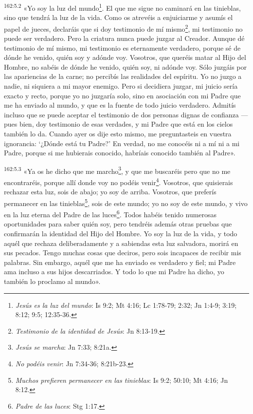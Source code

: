 \par
\textsuperscript{162:5.2} «Yo soy la luz del mundo\footnote{\textit{Jesús es la luz del mundo}: Is 9:2; Mt 4:16; Lc 1:78-79; 2:32; Jn 1:4-9; 3:19; 8:12; 9:5; 12:35-36.}. El que me sigue no caminará en las tinieblas, sino que tendrá la luz de la vida. Como os atrevéis a enjuiciarme y asumís el papel de jueces, declaráis que si doy testimonio de mí mismo\footnote{\textit{Testimonio de la identidad de Jesús}: Jn 8:13-19.}, mi testimonio no puede ser verdadero. Pero la criatura nunca puede juzgar al Creador. Aunque dé testimonio de mí mismo, mi testimonio es eternamente verdadero, porque sé de dónde he venido, quién soy y adónde voy. Vosotros, que queréis matar al Hijo del Hombre, no sabéis de dónde he venido, quién soy, ni adónde voy. Sólo juzgáis por las apariencias de la carne; no percibís las realidades del espíritu. Yo no juzgo a nadie, ni siquiera a mi mayor enemigo. Pero si decidiera juzgar, mi juicio sería exacto y recto, porque yo no juzgaría solo, sino en asociación con mi Padre que me ha enviado al mundo, y que es la fuente de todo juicio verdadero. Admitís incluso que se puede aceptar el testimonio de dos personas dignas de confianza ---pues bien, doy testimonio de esas verdades, y mi Padre que está en los cielos también lo da. Cuando ayer os dije esto mismo, me preguntasteis en vuestra ignorancia: `¿Dónde está tu Padre?' En verdad, no me conocéis ni a mí ni a mi Padre, porque si me hubierais conocido, habríais conocido también al Padre».

\par
\textsuperscript{162:5.3} «Ya os he dicho que me marcho\footnote{\textit{Jesús se marcha}: Jn 7:33; 8:21a.}, y que me buscaréis pero que no me encontraréis, porque allí donde voy no podéis venir\footnote{\textit{No podéis venir}: Jn 7:34-36; 8:21b-23.}. Vosotros, que quisierais rechazar esta luz, sois de abajo; yo soy de arriba. Vosotros, que preferís permanecer en las tinieblas\footnote{\textit{Muchos prefieren permanecer en las tinieblas}: Is 9:2; 50:10; Mt 4:16; Jn 8:12.}, sois de este mundo; yo no soy de este mundo, y vivo en la luz eterna del Padre de las luces\footnote{\textit{Padre de las luces}: Stg 1:17.}. Todos habéis tenido numerosas oportunidades para saber quién soy, pero tendréis además otras pruebas que confirmarán la identidad del Hijo del Hombre. Yo soy la luz de la vida, y todo aquél que rechaza deliberadamente y a sabiendas esta luz salvadora, morirá en sus pecados. Tengo muchas cosas que deciros, pero sois incapaces de recibir mis palabras. Sin embargo, aquél que me ha enviado es verdadero y fiel; mi Padre ama incluso a sus hijos descarriados. Y todo lo que mi Padre ha dicho, yo también lo proclamo al mundo».

